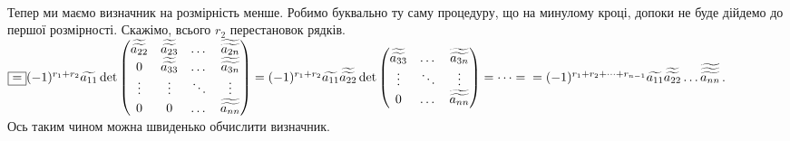 \documentclass[a4paper, 10pt]{article}
\theoremstyle{theoremdd}
\begin{document}
\bigskip \\
Тепер ми маємо визначник на розмірність менше. Робимо буквально ту саму процедуру, що на минулому кроці, допоки не буде дійдемо до першої розмірності. Скажімо, всього $r_2$ перестановок рядків.\\
$\boxed{=} (-1)^{r_1+r_2} \widetilde{a_{11}} \det \begin{pmatrix}
\widetilde{\widetilde{a_{22}}} & \widetilde{\widetilde{a_{23}}} & \dots & \widetilde{\widetilde{a_{2n}}} \\
0 & \widetilde{\widetilde{a_{33}}} & \dots & \widetilde{\widetilde{a_{3n}}} \\
\vdots & \vdots & \ddots & \vdots \\
0 & 0 & \dots & \widetilde{\widetilde{a_{nn}}} \\
\end{pmatrix} = (-1)^{r_1+r_2} \widetilde{a_{11}} \widetilde{\widetilde{a_{22}}} \det \begin{pmatrix}
\widetilde{\widetilde{a_{33}}} & \dots & \widetilde{\widetilde{a_{3n}}} \\
\vdots & \ddots & \vdots \\
0 & \dots & \widetilde{\widetilde{a_{nn}}} \\
\end{pmatrix} = \dots = \\ = (-1)^{r_1+r_2+\dots+r_{n-1}} \widetilde{a_{11}} \widetilde{\widetilde{a_{22}}} \dots \widetilde{\widetilde{\widetilde{{a_{nn}}}}}$.\\
Ось таким чином можна швиденько обчислити визначник.
\end{document}
